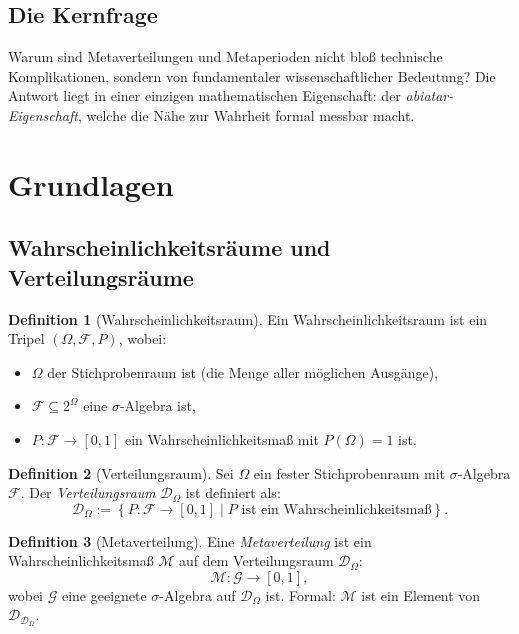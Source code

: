 \documentclass[a4paper,12pt]{article}
\theoremstyle{definition}
\newtheorem{definition}{Definition}
\begin{document}
\subsection{Die Kernfrage}

Warum sind Metaverteilungen und Metaperioden nicht bloß technische Komplikationen, sondern von fundamentaler wissenschaftlicher Bedeutung? Die Antwort liegt in einer einzigen mathematischen Eigenschaft: der \textit{abiatar-Eigenschaft}, welche die Nähe zur Wahrheit formal messbar macht.

\section{Grundlagen}

\subsection{Wahrscheinlichkeitsräume und Verteilungsräume}

\begin{definition}[Wahrscheinlichkeitsraum]
Ein Wahrscheinlichkeitsraum ist ein Tripel $(\Omega, \mathcal{F}, P)$, wobei:
\begin{itemize}
	\item $\Omega$ der Stichprobenraum ist (die Menge aller möglichen Ausgänge),
	\item $\mathcal{F} \subseteq 2^\Omega$ eine $\sigma$-Algebra ist,
	\item $P: \mathcal{F} \to [0,1]$ ein Wahrscheinlichkeitsmaß mit $P(\Omega) = 1$ ist.
\end{itemize}
\end{definition}

\begin{definition}[Verteilungsraum]
Sei $\Omega$ ein fester Stichprobenraum mit $\sigma$-Algebra $\mathcal{F}$. Der \textit{Verteilungsraum} $\mathcal{D}_\Omega$ ist definiert als:
\[
\mathcal{D}_\Omega := \left\{ P: \mathcal{F} \to [0,1] \mid P \text{ ist ein Wahrscheinlichkeitsmaß} \right\}.
\]
\end{definition}

\begin{definition}[Metaverteilung]
Eine \textit{Metaverteilung} ist ein Wahrscheinlichkeitsmaß $\mathcal{M}$ auf dem Verteilungsraum $\mathcal{D}_\Omega$:
\[
\mathcal{M}: \mathcal{G} \to [0,1],
\]
wobei $\mathcal{G}$ eine geeignete $\sigma$-Algebra auf $\mathcal{D}_\Omega$ ist. Formal: $\mathcal{M}$ ist ein Element von $\mathcal{D}_{\mathcal{D}_\Omega}$.
\end{definition}
\end{document}
